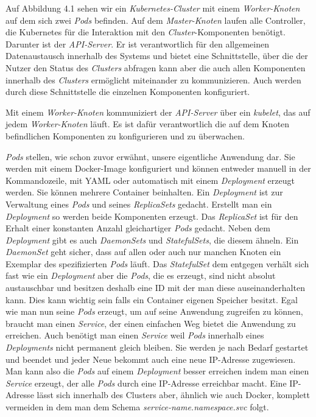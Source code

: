 \documentclass[12pt,a4paper]{scrartcl}
\begin{document}
Auf Abbildung 4.1 sehen wir ein \emph{Kubernetes-Cluster} mit einem \emph{Worker-Knoten} auf dem sich zwei \emph{Pods} befinden. Auf dem \emph{Master-Knoten} laufen alle Controller, die Kubernetes für die Interaktion mit den \emph{Cluster}-Komponenten benötigt. Darunter ist der \emph{API-Server}. Er ist verantwortlich für den allgemeinen Datenaustausch innerhalb des Systems und bietet eine Schnittstelle, über die der Nutzer den Status des \emph{Clusters} abfragen kann aber die auch allen Komponenten innerhalb des \emph{Clusters} ermöglicht miteinander zu kommunizieren. Auch werden durch diese Schnittstelle die einzelnen Komponenten konfiguriert.

Mit einem \emph{Worker-Knoten} kommuniziert der \textit{API-Server} über ein \emph{kubelet}, das auf jedem \emph{Worker-Knoten} läuft. Es ist dafür verantwortlich die auf dem Knoten befindlichen Komponenten zu konfigurieren und zu überwachen. 

\emph{Pods} stellen, wie schon zuvor erwähnt, unsere eigentliche Anwendung dar. Sie werden mit einem Docker-Image konfiguriert und können entweder manuell in der Kommandozeile, mit YAML oder automatisch mit einem \emph{Deployment} erzeugt werden. Sie können mehrere Container beinhalten.
Ein \emph{Deployment} ist zur Verwaltung eines \emph{Pods} und seines \emph{ReplicaSets} gedacht. Erstellt man ein \emph{Deployment} so werden beide Komponenten erzeugt.
Das \emph{ReplicaSet} ist für den Erhalt einer konstanten Anzahl gleichartiger \emph{Pods} gedacht. 
Neben dem \emph{Deployment} gibt es auch \emph{DaemonSets} und \emph{StatefulSets}, die diesem ähneln. 
Ein \emph{DaemonSet} geht sicher, dass auf allen oder auch nur manchen Knoten ein Exemplar des spezifizierten \emph{Pods} läuft. 
Das \emph{StatefulSet} dem entgegen verhält sich fast wie ein \emph{Deployment} aber die \emph{Pods}, die es erzeugt, sind nicht absolut austauschbar und besitzen deshalb eine ID mit der man diese auseinanderhalten kann. Dies kann wichtig sein falls ein Container eigenen Speicher besitzt. 
Egal wie man nun seine \emph{Pods} erzeugt, um auf seine Anwendung zugreifen zu können, braucht man einen \emph{Service}, der einen einfachen Weg bietet die Anwendung zu erreichen. Auch benötigt man einen \emph{Service} weil \emph{Pods} innerhalb eines \emph{Deployments} nicht permanent gleich bleiben. Sie werden je nach Bedarf gestartet und beendet und jeder Neue bekommt auch eine neue IP-Adresse zugewiesen. Man kann also die \emph{Pods} auf einem \emph{Deployment} besser erreichen indem man einen \emph{Service} erzeugt, der alle \emph{Pods} durch eine IP-Adresse erreichbar macht. Eine IP-Adresse lässt sich innerhalb des Clusters aber, ähnlich wie auch Docker, komplett vermeiden in dem man dem Schema \emph{service-name.namespace.svc} folgt.
\end{document}
